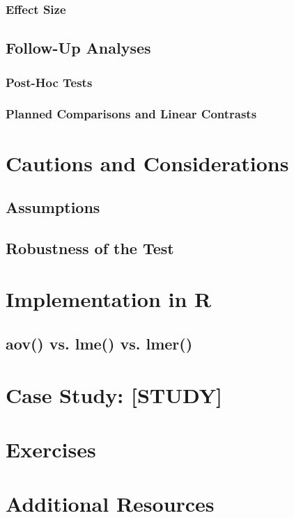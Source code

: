 \subsubsection{Effect Size}

\subsection{Follow-Up Analyses}

\subsubsection{Post-Hoc Tests}

\subsubsection{Planned Comparisons and Linear Contrasts}

\section{Cautions and Considerations}

\subsection{Assumptions}

\subsection{Robustness of the Test}

\section{Implementation in R}

\subsection{aov() vs. lme() vs. lmer()}

\section{Case Study: [STUDY]}

\section{Exercises}

\section{Additional Resources}

